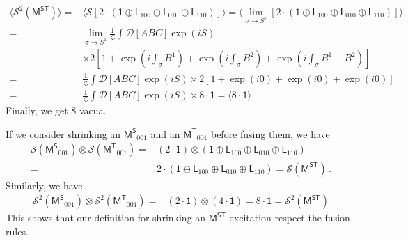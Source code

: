 \documentclass[11pt,nofootinbib,preprint]{revtex4-1}
\begin{document}
\begin{align}
	\langle \mathcal{S} ^2\left( \mathsf{M^{ST}} \right) \rangle =&\langle \mathcal{S} \left[ 2\cdot \left( \mathsf{1}\oplus \mathsf{L}_{100}\oplus \mathsf{L}_{010}\oplus \mathsf{L}_{110} \right) \right]  \rangle =\langle \underset{\sigma \rightarrow S^1}{\lim}\left[ 2\cdot \left( \mathsf{1}\oplus \mathsf{L}_{100}\oplus \mathsf{L}_{010}\oplus \mathsf{L}_{110} \right) \right]  \rangle \nonumber
	\\
	=&\underset{\sigma \rightarrow S^1}{\lim}\frac{1}{\mathcal{Z}}\int{\mathcal{D} \left[ ABC \right] \exp \left( iS \right)} \nonumber
	\\
	&\times 2\left[ 1+\exp \left( i\int_{\sigma}{B^1} \right) +\exp \left( i\int_{\sigma}{B^2} \right) +\exp \left( i\int_{\sigma}{B^1+B^2} \right) \right] \nonumber
	\\
	=&\frac{1}{\mathcal{Z}}\int{\mathcal{D} \left[ ABC\right] \exp \left( iS \right) \times 2\left[ 1+\exp \left( i0 \right) +\exp \left( i0 \right) +\exp \left( i0 \right) \right]} \nonumber
	\\
	=&\frac{1}{\mathcal{Z}}\int{\mathcal{D} \left[ ABC \right] \exp \left( iS \right) \times 8\cdot \mathsf{1}} =\langle 8\cdot \mathsf{1} \rangle 
\end{align}
Finally, we get $8$ vacua.

If we consider shrinking an $\mathsf{M^S}_{001}$ and an $\mathsf{M^T}_{001}$ before fusing them, we have 
\begin{align}
	\mathcal{S} \left( \mathsf{M^S}_{001} \right)\otimes\mathcal{S} \left( \mathsf{M^T}_{001} \right)=&\left(2\cdot\mathsf{1}\right)\otimes\left( \mathsf{1}\oplus \mathsf{L}_{100}\oplus \mathsf{L}_{010}\oplus \mathsf{L}_{110} \right)\nonumber
	\\
	=&2\cdot\left(\mathsf{1}\oplus \mathsf{L}_{100}\oplus \mathsf{L}_{010}\oplus \mathsf{L}_{110}\right) =\mathcal{S} \left( \mathsf{M^{ST}} \right)\,.
\end{align}
Similarly, we have 
\begin{align}
	\mathcal{S}^2 \left( \mathsf{M^S}_{001} \right)\otimes\mathcal{S}^2 \left( \mathsf{M^T}_{001} \right)=&\left(2\cdot\mathsf{1}\right)\otimes\left(4\cdot\mathsf{1}\right)=8\cdot\mathsf{1}=\mathcal{S}^2 \left( \mathsf{M^{ST}} \right)
\end{align}
This shows that our definition for shrinking an $\mathsf{M^{ST}}$-excitation respect the fusion rules.
\end{document}
